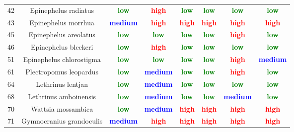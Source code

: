 \documentclass{report}\usepackage[]{graphicx}\usepackage[]{color}
\begin{document}
\begin{table}[ht]
{\begin{tabular}{cccccccc}
   42 & Epinephelus radiatus & \textcolor{green}{\textbf{low}} & \textcolor{red}{\textbf{high}} & \textcolor{green}{\textbf{low}} & \textcolor{green}{\textbf{low}} & \textcolor{green}{\textbf{low}} & \textcolor{green}{\textbf{low}} \\ 
   43 & Epinephelus morrhua & \textcolor{blue}{\textbf{medium}} & \textcolor{red}{\textbf{high}} & \textcolor{red}{\textbf{high}} & \textcolor{red}{\textbf{high}} & \textcolor{red}{\textbf{high}} & \textcolor{red}{\textbf{high}} \\ 
   45 & Epinephelus areolatus & \textcolor{green}{\textbf{low}} & \textcolor{green}{\textbf{low}} & \textcolor{green}{\textbf{low}} & \textcolor{green}{\textbf{low}} & \textcolor{red}{\textbf{high}} & \textcolor{green}{\textbf{low}} \\ 
   46 & Epinephelus bleekeri & \textcolor{green}{\textbf{low}} & \textcolor{red}{\textbf{high}} & \textcolor{green}{\textbf{low}} & \textcolor{green}{\textbf{low}} & \textcolor{green}{\textbf{low}} & \textcolor{green}{\textbf{low}} \\ 
   51 & Epinephelus chlorostigma & \textcolor{green}{\textbf{low}} & \textcolor{green}{\textbf{low}} & \textcolor{green}{\textbf{low}} & \textcolor{green}{\textbf{low}} & \textcolor{red}{\textbf{high}} & \textcolor{blue}{\textbf{medium}} \\ 
   61 & Plectropomus leopardus & \textcolor{green}{\textbf{low}} & \textcolor{blue}{\textbf{medium}} & \textcolor{green}{\textbf{low}} & \textcolor{green}{\textbf{low}} & \textcolor{red}{\textbf{high}} & \textcolor{green}{\textbf{low}} \\ 
   64 & Lethrinus lentjan & \textcolor{green}{\textbf{low}} & \textcolor{blue}{\textbf{medium}} & \textcolor{green}{\textbf{low}} & \textcolor{green}{\textbf{low}} & \textcolor{green}{\textbf{low}} & \textcolor{green}{\textbf{low}} \\ 
   68 & Lethrinus amboinensis & \textcolor{green}{\textbf{low}} & \textcolor{blue}{\textbf{medium}} & \textcolor{green}{\textbf{low}} & \textcolor{green}{\textbf{low}} & \textcolor{blue}{\textbf{medium}} & \textcolor{green}{\textbf{low}} \\ 
   70 & Wattsia mossambica & \textcolor{green}{\textbf{low}} & \textcolor{blue}{\textbf{medium}} & \textcolor{red}{\textbf{high}} & \textcolor{red}{\textbf{high}} & \textcolor{red}{\textbf{high}} & \textcolor{red}{\textbf{high}} \\ 
   71 & Gymnocranius grandoculis & \textcolor{blue}{\textbf{medium}} & \textcolor{red}{\textbf{high}} & \textcolor{red}{\textbf{high}} & \textcolor{red}{\textbf{high}} & \textcolor{red}{\textbf{high}} & \textcolor{red}{\textbf{high}} \\ 

\end{tabular}}
\end{table}
\end{document}
